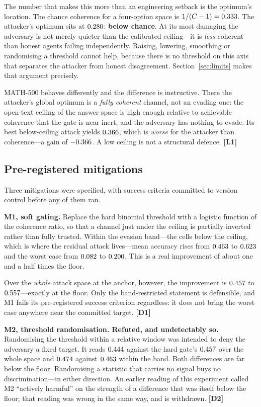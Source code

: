The number that makes this more than an engineering setback is the optimum's
location. The chance coherence for a four-option space is $1/(C-1) =
0.333$. The attacker's optimum sits at $0.280$:
\textbf{below chance}. At its most damaging the adversary is not merely quieter
than the calibrated ceiling---it is \emph{less} coherent than honest agents
failing independently. Raising, lowering, smoothing or randomising a threshold
cannot help, because there is no threshold on this axis that separates the
attacker from honest disagreement. Section~\ref{sec:limits} makes that argument
precisely.

MATH-500 behaves differently and the difference is instructive. There the
attacker's global optimum is a \emph{fully coherent} channel, not an evading one:
the open-text ceiling of the answer space is high enough relative to achievable
coherence that the gate is near-inert, and the adversary has nothing to evade.
Its best below-ceiling attack yields $0.366$, which is
\emph{worse} for the attacker than coherence---a gain of
$-0.366$. A low ceiling is not a structural defence.
\textbf{[L1]}

\subsection{Pre-registered mitigations}

Three mitigations were specified, with success criteria committed to version
control before any of them ran.

\textbf{M1, soft gating.} Replace the hard binomial threshold with a logistic
function of the coherence ratio, so that a channel just under the ceiling is
partially inverted rather than fully trusted. Within the evasion band---the cells
below the ceiling, which is where the residual attack lives---mean accuracy rises
from $0.463$ to $0.623$ and the worst case from
$0.082$ to $0.200$. This is a real improvement
of about one and a half times the floor.

Over the \emph{whole} attack space at the anchor, however, the improvement is
$0.457$ to $0.557$---exactly at the floor. Only the
band-restricted statement is defensible, and M1 fails its pre-registered success
criterion regardless: it does not bring the worst case anywhere near the
committed target. \textbf{[D1]}

\textbf{M2, threshold randomisation. Refuted, and undetectably so.} Randomising
the threshold within a relative window was intended to deny the adversary a fixed
target. It reads $0.444$ against the hard gate's
$0.457$ over the whole space and $0.474$ against
$0.463$ within the band. Both differences are far below the
floor. Randomising a statistic that carries no signal buys no discrimination---in
either direction. An earlier reading of this experiment called M2 ``actively
harmful'' on the strength of a difference that was itself below the floor; that
reading was wrong in the same way, and is withdrawn. \textbf{[D2]}

